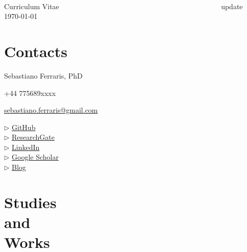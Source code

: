 \documentclass[margin,line]{resume}
\begin{document}
~
\vspace{-1cm}

{\sc \Large Curriculum Vitae ~~~~~~~~~~~~~~~~~~~~~~~~~~~~~~~~~~~~~~~~~~~~ \scriptsize update \today}
\begin{resume}
    
    
    \section{\mysidestyle Contacts}
    
    Sebastiano Ferraris, PhD
    
    +44 775689xxxx
    
    \href{mailto:sebastiano.ferraris@gmail.com}{sebastiano.ferraris@gmail.com}

    $\triangleright$ \href{http://www.github.com/SebastianoF}{GitHub}\\
    $\triangleright$ \href{https://www.researchgate.net/profile/Sebastiano_Ferraris}{ResearchGate}\\
    $\triangleright$ \href{https://www.linkedin.com/in/ibis-redibis/}{LinkedIn}\\
    $\triangleright$ \href{https://scholar.google.com/citations?user=1tAeAI0AAAAJ&hl=en}{Google Scholar}\\
    $\triangleright$ \href{https://geospatial.netlify.app/posts/}{Blog}


\section{\mysidestyle Studies \\ and \\ Works}



\end{resume}
\end{document}

